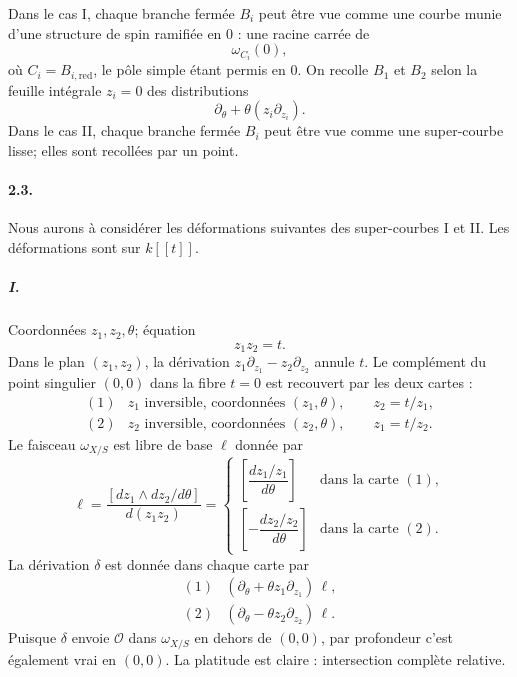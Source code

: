 \documentclass[11pt]{article}
\newcommand{\cO}{\mathcal O}
\begin{document}
Dans le cas I, chaque branche fermée $B_i$ peut être vue comme une courbe munie d'une structure de spin ramifiée en $0$ : une racine carrée de
\[
  \omega_{C_i}(0),
\]
où $C_i=B_{i,\mathrm{red}}$, le pôle simple étant permis en $0$. On recolle $B_1$ et $B_2$ selon la feuille intégrale $z_i=0$ des distributions
\[
  \partial_\theta+\theta(z_i\partial_{z_i}).
\]
Dans le cas II, chaque branche fermée $B_i$ peut être vue comme une super-courbe lisse; elles sont recollées par un point.

\paragraph{2.3.}
Nous aurons à considérer les déformations suivantes des super-courbes I et II. Les déformations sont sur $k[[t]]$.

\subparagraph{I.}
Coordonnées $z_1,z_2,\theta$; équation
\[
  z_1z_2=t.
\]
Dans le plan $(z_1,z_2)$, la dérivation $z_1\partial_{z_1}-z_2\partial_{z_2}$ annule $t$. Le complément du point singulier $(0,0)$ dans la fibre $t=0$ est recouvert par les deux cartes :
\[
\begin{array}{ll}
(1)& z_1\text{ inversible, coordonnées }(z_1,\theta),\qquad z_2=t/z_1,\\
(2)& z_2\text{ inversible, coordonnées }(z_2,\theta),\qquad z_1=t/z_2.
\end{array}
\]
Le faisceau $\omega_{X/S}$ est libre de base $\ell$ donnée par
\[
  \ell=\frac{[dz_1\wedge dz_2/d\theta]}{d(z_1z_2)}
  =\begin{cases}
  \left[\dfrac{dz_1/z_1}{d\theta}\right]&\text{dans la carte }(1),\\[1.2ex]
  \left[-\dfrac{dz_2/z_2}{d\theta}\right]&\text{dans la carte }(2).
  \end{cases}
\]
La dérivation $\delta$ est donnée dans chaque carte par
\[
\begin{array}{ll}
(1)&(\partial_\theta+\theta z_1\partial_{z_1})\,\ell,\\
(2)&(\partial_\theta-\theta z_2\partial_{z_2})\,\ell.
\end{array}
\]
Puisque $\delta$ envoie $\cO$ dans $\omega_{X/S}$ en dehors de $(0,0)$, par profondeur c'est également vrai en $(0,0)$. La platitude est claire : intersection complète relative.
\end{document}
